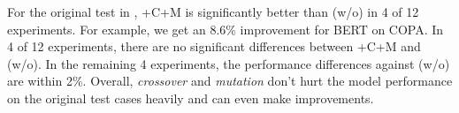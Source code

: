 For the original test in , 
+C+M is significantly better than (w/o) in 4 of 12 experiments. 
For example, we get an 8.6\% 
improvement for BERT on COPA. 
In 4 of 12 experiments, there are no significant differences between +C+M 
and (w/o). In the remaining 4 experiments, 
the performance differences against (w/o) are within 2\%. 
Overall, \textit{crossover} and \textit{mutation} don't hurt the model performance on 
the original test cases heavily and can even make improvements. 






